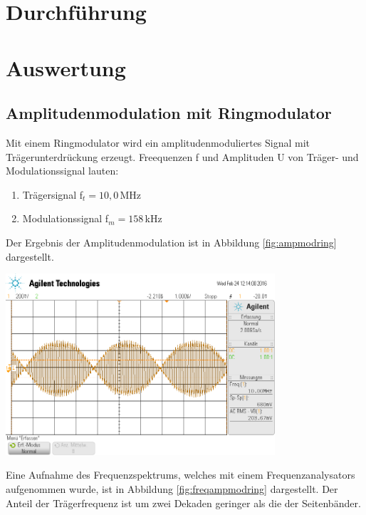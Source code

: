 \documentclass[]{scrartcl}
\begin{document}
\section{Durchführung}

\section{Auswertung}

\subsection{Amplitudenmodulation mit Ringmodulator}
Mit einem Ringmodulator wird ein amplitudenmoduliertes Signal mit Trägerunterdrückung erzeugt. Freequenzen f und Amplituden U von Träger- und Modulationssignal lauten:
\begin{enumerate}
	\item Trägersignal f$_t=10,0$\,MHz
	\item Modulationssignal f$_m=158$\,kHz
\end{enumerate}
Der Ergebnis der Amplitudenmodulation ist in Abbildung \ref{fig:ampmodring} dargestellt.
\begin{center}
	\includegraphics[width=10cm]{images/ampmodring.png}
	\label{fig:ampmodring}
\end{center}
Eine Aufnahme des Frequenzspektrums, welches mit einem Frequenzanalysators aufgenommen wurde, ist in Abbildung \ref{fig:freqampmodring} dargestellt. Der Anteil der Trägerfrequenz ist um zwei Dekaden geringer als die der Seitenbänder. 
\end{document}
